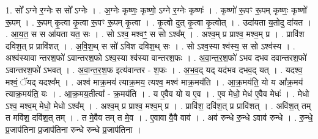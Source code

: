 \documentclass[17pt]{extarticle}
\begin{document}
1. सो᳚ ऽग्ने र॒ग्नेः स सो᳚ ऽग्नेः । . अ॒ग्नेः कृष्णः॒ कृष्णो॒ ऽग्ने र॒ग्नेः कृष्णः॑ । . कृष्णो॑ रू॒पꣳ रू॒पम् कृष्णः॒ कृष्णो॑ रू॒पम् । . रू॒पम् कृ॒त्वा कृ॒त्वा रू॒पꣳ रू॒पम् कृ॒त्वा । . कृ॒त्वो दुत् कृ॒त्वा कृ॒त्वोत् । . उदा॑यता य॒तोदु दा॑यत । . आ॒य॒त॒ स स आ॑यता यत॒ सः । . सो ऽश्व॒ मश्वꣳ॒॒ स सो ऽश्व᳚म् । . अश्व॒म् प्र प्राश्व॒ मश्व॒म् प्र । . प्रावि॑श दविश॒त् प्र प्रावि॑शत् । . अ॒वि॒श॒थ् स सो॑ ऽविश दविश॒थ् सः । . सो ऽश्व॒स्या श्व॑स्य॒ स सो ऽश्व॑स्य । . अश्व॑स्यावा न्तरश॒फो॑ ऽवान्तरश॒फो ऽश्व॒स्या श्व॑स्या वान्तरश॒फः । . अ॒वा॒न्त॒र॒श॒फो॑ ऽभव दभव दवान्तरश॒फो॑ ऽवान्तरश॒फो॑ ऽभवत् । . अ॒वा॒न्त॒र॒श॒फ इत्य॑वान्तर - श॒फः । . अ॒भ॒व॒द् यद् यद॑भव दभव॒द् यत् । . यदश्व॒ मश्वं॒ ॅयद् यदश्व᳚म् । . अश्व॑ माक्र॒मय॑ त्याक्र॒मय॒ त्यश्व॒ मश्व॑ माक्र॒मय॑ति । . आ॒क्र॒मय॑ति॒ यो य आ᳚क्र॒मय॑ त्याक्र॒मय॑ति॒ यः । . आ॒क्र॒मय॒तीत्या᳚ - क्र॒मय॑ति । . य ए॒वैव यो य ए॒व । . ए॒व मेधो॒ मेध॑ ए॒वैव मेधः॑ । . मेधो ऽश्व॒ मश्व॒म् मेधो॒ मेधो ऽश्व᳚म् । . अश्व॒म् प्र प्राश्व॒ मश्व॒म् प्र । . प्रावि॑श॒ दवि॑श॒त् प्र प्रावि॑शत् । . अवि॑श॒त् तम् त मवि॑श॒ दवि॑श॒त् तम् । . त मे॒वैव तम् त मे॒व । . ए॒वावा वै॒वै वाव॑ । . अव॑ रुन्धे रु॒न्धे ऽवाव॑ रुन्धे । . रु॒न्धे॒ प्र॒जाप॑तिना प्र॒जाप॑तिना रुन्धे रुन्धे प्र॒जाप॑तिना । \newline
\end{document}
